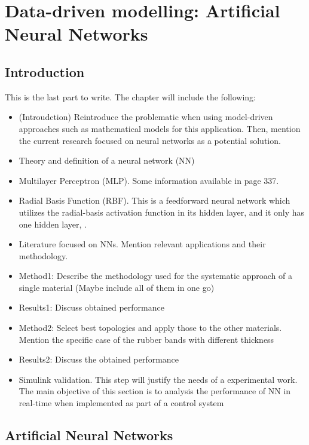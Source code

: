 \chapter{Data-driven modelling: Artificial Neural Networks}

\section{Introduction}

This is the last part to write. The chapter will include the following:

\begin{itemize}
    \item (Introudction) Reintroduce the problematic when using model-driven approaches such as mathematical models for this application. Then, mention the current research focused on neural networks as a potential solution.
    \item Theory and definition of a neural network (NN)
    \item Multilayer Perceptron (MLP). Some information available in \cite{aulova2017determination} page 337.
    \item Radial Basis Function (RBF). This is a feedforward neural network which utilizes the radial-basis activation function in its hidden layer, and it only has one hidden layer, \cite{aulova2017determination}.
    \item Literature focused on NNs. Mention relevant applications and their methodology.
    \item Method1: Describe the methodology used for the systematic approach of a single material (Maybe include all of them in one go)
    \item Results1: Discuss obtained performance
    \item Method2: Select best topologies and apply those to the other materials. Mention the specific case of the rubber bands with different thickness
    \item Results2: Discuss the obtained performance
    \item Simulink validation. This step will justify the needs of a experimental work. The main objective of this section is to analysis the performance of NN in real-time when implemented as part of a control system
\end{itemize}

\section{Artificial Neural Networks}

